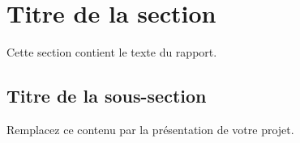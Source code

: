 \section{Titre de la section}

Cette section contient le texte du rapport.

\subsection{Titre de la sous-section}

Remplacez ce contenu par la présentation de votre projet.
